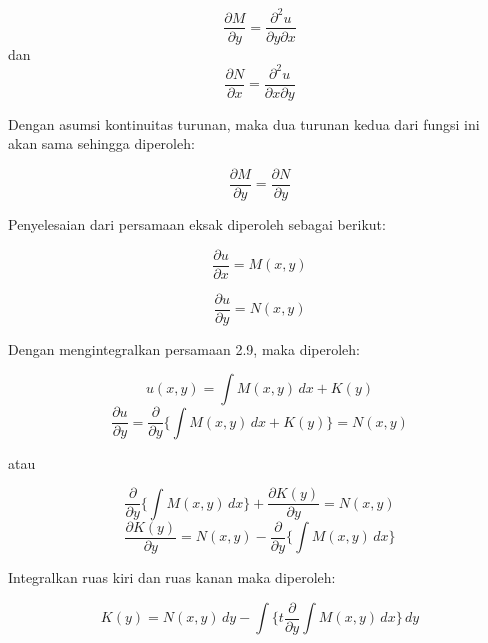 \begin{displaymath} \dfrac{\partial M}{\partial y} = \dfrac{\partial^{2} u}{\partial y \partial x} \end{displaymath} dan \begin{displaymath}  \dfrac{\partial N}{\partial x} = \dfrac{\partial^{2} u}{\partial x \partial y} \end{displaymath}

Dengan asumsi kontinuitas turunan, maka dua turunan kedua dari fungsi ini akan sama sehingga diperoleh:

\begin{displaymath} \dfrac{\partial M}{\partial y} = \dfrac{\partial N}{\partial y} \end{displaymath}

Penyelesaian dari persamaan eksak diperoleh sebagai berikut:

\begin{equation} \dfrac{\partial u}{\partial x} = M(x, y) \end{equation}

\begin{equation} \dfrac{\partial u}{\partial y} = N(x, y) \end{equation}

Dengan mengintegralkan persamaan 2.9, maka diperoleh:

\begin{displaymath} u(x, y) = \int M(x, y) \, dx + K(y) \end{displaymath}
\begin{displaymath} \dfrac{\partial u}{\partial y} = \dfrac{\partial}{\partial y} \bigg\{ \int M(x, y) \,dx + K(y) \bigg\} = N(x, y) \end{displaymath}

atau

\begin{displaymath} \dfrac{\partial}{\partial y} \bigg\{ \int M(x, y) \, dx \bigg\} + \dfrac{\partial K(y)}{\partial y} = N(x,y) \end{displaymath}
\begin{displaymath} \dfrac{\partial K(y)}{\partial y} = N(x,y) - \dfrac{\partial}{\partial y} \bigg\{ \int M(x, y) \, dx \bigg\} \end{displaymath}

Integralkan ruas kiri dan ruas kanan maka diperoleh:

\begin{displaymath} K(y) = N(x, y) \, dy - \int \bigg\{t\dfrac{\partial}{\partial y} \int M(x, y) \, dx \bigg\} \, dy \end{displaymath}

